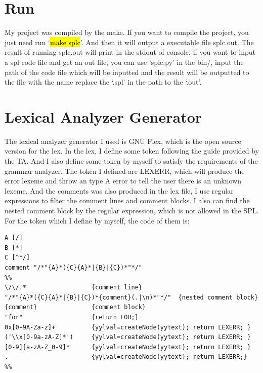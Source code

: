 \documentclass{article}
\begin{document}
    \section{Run}
        My project was compiled by the make. If you want to compile the project, you just need run `\hl{make splc}'. And then it will output a executable file splc.out. 
        The result of running splc.out will print in the stdout of console, if you want to input a spl code file and get an out file, you can use `splc.py' in the bin/, input
        the path of the code file which will be inputted and the result will be outputted to the file with the name replace the `.spl' in the path to the `.out'.
    \section{Lexical Analyzer Generator}
        \label{sec:lex}
        The lexical analyzer generator I used is GNU Flex, which is the open source version for the
        lex. In the lex, I define some token following the guide provided by the TA. And I also define some
        token by myself to satisfy the requirements of the grammar analyzer. The token I defined are 
        LEXERR, which will produce the error lexeme and throw an type A error to tell the user there is an unknown
        lexeme. And the comments was also produced in the lex file, I use regular expressions to filter the
        comment lines and comment blocks. I also can find the nested comment block by the regular expression, which is not allowed in the SPL.
        For the token which I define by myself, the code of them is:
        \begin{lstlisting}
A [/]
B [*]
C [^*/]
comment "/*"{A}*({C}{A}*|{B}|{C})*"*/"
%%
\/\/.*                  {comment line}
"/*"{A}*({C}{A}*|{B}|{C})*{comment}(.|\n)*"*/"  {nested comment block}
{comment}               {comment block}
"for"                   {return FOR;}
0x[0-9A-Za-z]+          {yylval=createNode(yytext); return LEXERR; }
('\\x[0-9a-zA-Z]*')     {yylval=createNode(yytext); return LEXERR; }
[0-9][a-zA-Z_0-9]*      {yylval=createNode(yytext); return LEXERR; }
.                       {yylval=createNode(yytext); return LEXERR;}
%%
        \end{lstlisting}
\end{document}
